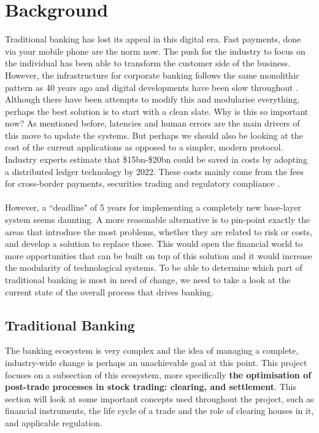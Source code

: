 \documentclass[12pt,twoside]{article}
\begin{document}
\section{Background}
\label{sec:Background}
Traditional banking has lost its appeal in this digital era. Fast payments, done via your mobile phone are the norm now. The push for the industry to focus on the individual has been able to transform the customer side of the business. However, the infrastructure for corporate banking follows the same monolithic pattern as 40 years ago and digital developments have been slow throughout \cite{slow}. Although there have been attempts to modify this and modularise everything, perhaps the best solution is to start with a clean slate. Why is this so important now? As mentioned before, latencies and human errors are the main drivers of this move to update the systems. But perhaps we should also be looking at the cost of the current applications as opposed to a simpler, modern protocol. Industry experts estimate that \$15bn-\$20bn could be saved in costs by adopting a distributed ledger technology by 2022. These costs mainly come from the fees for cross-border payments, securities trading and regulatory compliance \cite{Clearing:cost}.
\\ \\
However, a ``deadline" of 5 years for implementing a completely new base-layer system seems daunting. A more reasonable alternative is to pin-point exactly the areas that introduce the most problems, whether they are related to risk or costs, and develop a solution to replace those. This would open the financial world to more opportunities that can be built on top of this solution and it would increase the modularity of technological systems. To be able to determine which part of traditional banking is most in need of change, we need to take a look at the current state of the overall process that drives banking. 

\subsection{Traditional Banking}
\label{sub:TraditionalBanking}
The banking ecosystem is very complex and the idea of managing a complete, industry-wide change is perhaps an unachievable goal at this point. This project focuses on a subsection of this ecosystem, more specifically \textbf{the optimisation of post-trade processes in stock trading: clearing, and settlement}. This section will look at some important concepts used throughout the project, such as financial instruments, the life cycle of a trade and the role of clearing houses in it, and applicable regulation.
\end{document}

